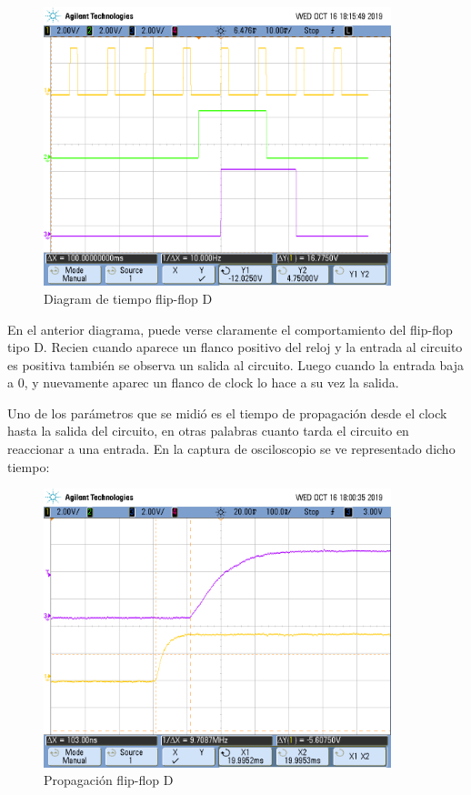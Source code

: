 \begin{figure}[H]
	\centering
	\includegraphics[width=0.9\textwidth]{Ejercicio6/Recursos/senales_ffD.png}
	\caption{Diagram de tiempo flip-flop D}
\end{figure}

En el anterior diagrama, puede verse claramente el comportamiento del flip-flop tipo D. Recien cuando aparece un flanco positivo del reloj y la entrada al circuito es positiva también se observa un salida al circuito. Luego cuando la entrada baja a $0$, y nuevamente aparec un flanco de clock lo hace a su vez la salida. 

Uno de los parámetros que se midió es el tiempo de propagación desde el clock hasta la salida del circuito, en otras palabras cuanto tarda el circuito en reaccionar a una entrada. En la captura de osciloscopio se ve representado dicho tiempo:


\begin{figure}[H]
	\centering
	\includegraphics[width=0.9\textwidth]{Ejercicio6/Recursos/propagacion_ffD.png}
	\caption{Propagaci\'on flip-flop D}
\end{figure}


